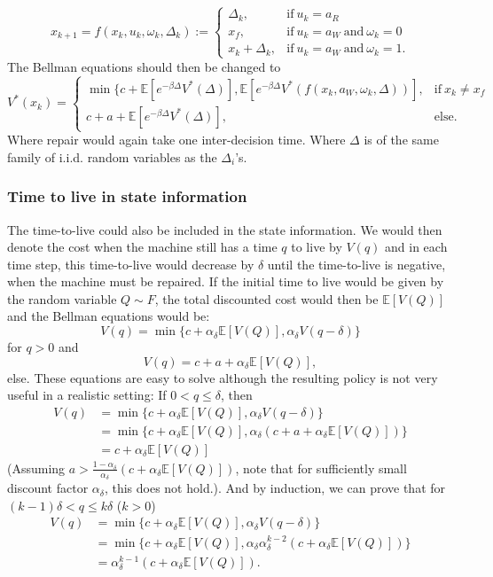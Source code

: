 $$
x_{k+1}=f(x_k,u_k,\omega_k,\Delta_k):=\begin{cases}
\Delta_k,&\text{if}\ u_k=a_R \\
x_f,&\text{if}\ u_k=a_W\ \text{and}\ \omega_k=0 \\
x_k+\Delta_k,&\text{if}\ u_k=a_W\ \text{and}\ \omega_k=1.
\end{cases}
$$
The Bellman equations should then be changed to
$$
V^*(x_k)=\begin{cases}
\min\{c+\mathbb{E}[e^{-\beta \Delta} V^*(\Delta)],\mathbb{E}[e^{-\beta \Delta} V^*(f(x_k,a_W,\omega_k,\Delta))],&\text{if}\ x_k\neq x_f \\
c+a+\mathbb{E}[e^{-\beta \Delta} V^*(\Delta)],&\text{else.}
\end{cases}
$$
Where repair would again take one inter-decision time. Where $\Delta$ is of the same family of i.i.d. random variables as the $\Delta_i$'s.

\subsubsection{Time to live in state information}
The time-to-live could also be included in the state information.
We would then denote the cost when the machine still has a time $q$ to live by $V(q)$ and in each time step, this time-to-live would decrease by $\delta$ until the time-to-live is negative, when the machine must be repaired.
If the initial time to live would be given by the random variable $Q\sim F$, the total discounted cost would then be $\mathbb{E}[V(Q)]$ and the Bellman equations would be:
$$
V(q)=\min\{
c+\alpha_{\delta} \mathbb{E}[V(Q)],
\alpha_{\delta} V(q-\delta)
\}
$$
for $q>0$ and
$$
V(q)=c + a + \alpha_{\delta} \mathbb{E}[V(Q)],
$$
else.
These equations are easy to solve although the resulting policy is not very useful in a realistic setting:
If $0<q\leq\delta$, then 
\[
\begin{split}
V(q)&=\min\{
c+\alpha_{\delta} \mathbb{E}[V(Q)],\alpha_{\delta} V(q-\delta)\}\\
&=\min\{
c+\alpha_{\delta} \mathbb{E}[V(Q)],\alpha_{\delta}(c+a+\alpha_{\delta} \mathbb{E}[V(Q)])\}\\
&=c+\alpha_{\delta} \mathbb{E}[V(Q)]
\end{split}
\]
(Assuming $a>\frac{1-\alpha_\delta}{\alpha_\delta}(c+\alpha_\delta\mathbb{E}[V(Q)])$, note that for sufficiently small discount factor $\alpha_\delta$, this does not hold.).
And by induction, we can prove that for $(k-1)\delta<q\leq k\delta$ ($k>0$)
\[\begin{split}
V(q)&=\min\{
c+\alpha_{\delta} \mathbb{E}[V(Q)],\alpha_{\delta} V(q-\delta)\}\\
&=\min\{
c+\alpha_{\delta} \mathbb{E}[V(Q)],\alpha_{\delta} \alpha_{\delta}^{k-2}(c+\alpha_\delta\mathbb{E}[V(Q)])\}\\
&=\alpha_{\delta}^{k-1}(c+\alpha_\delta\mathbb{E}[V(Q)]).
\end{split}\]

